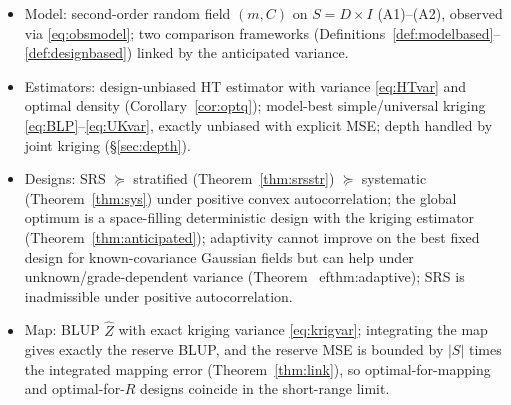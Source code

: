 \documentclass{amsart}
\theoremstyle{definition}
\newcommand{\Zhat}{\widehat Z}
\begin{document}
\begin{itemize}
\item[(a)] Model: second-order random field $(m,C)$ on $S=D\times I$
(A1)--(A2), observed via \eqref{eq:obsmodel}; two comparison frameworks
(Definitions~\ref{def:modelbased}--\ref{def:designbased}) linked by the
anticipated variance.
\item[(b)] Estimators: design-unbiased HT estimator with variance
\eqref{eq:HTvar} and optimal density (Corollary~\ref{cor:optq}); model-best
simple/universal kriging \eqref{eq:BLP}--\eqref{eq:UKvar}, exactly unbiased
with explicit MSE; depth handled by joint kriging (\S\ref{sec:depth}).
\item[(c)] Designs: SRS $\succeq$ stratified (Theorem~\ref{thm:srsstr})
$\succeq$ systematic (Theorem~\ref{thm:sys}) under positive convex
autocorrelation; the global optimum is a space-filling deterministic design
with the kriging estimator (Theorem~\ref{thm:anticipated}); adaptivity cannot improve on the best fixed design for known-covariance Gaussian fields but can help under unknown/grade-dependent variance (Theorem~
ef{thm:adaptive}); SRS is
inadmissible under positive autocorrelation.
\item[(d)] Map: BLUP $\Zhat$ with exact kriging variance
\eqref{eq:krigvar}; integrating the map gives exactly the reserve BLUP, and
the reserve MSE is bounded by $|S|$ times the integrated mapping error
(Theorem~\ref{thm:link}), so optimal-for-mapping and optimal-for-$R$
designs coincide in the short-range limit.
\end{itemize}
\end{document}
